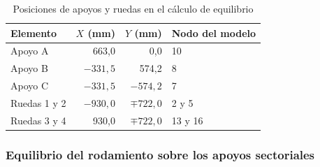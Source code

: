 \begin{table}[htbp]
\centering\small\singlespacing
\caption{Posiciones de apoyos y ruedas en el cálculo de equilibrio}
\label{tab:coordenadas-soporte}
\begin{tabular}{lrrl}
\toprule
\textbf{Elemento} & \textbf{$X$ (mm)} & \textbf{$Y$ (mm)} & \textbf{Nodo del modelo}\\
\midrule
Apoyo A & 663,0 & 0,0 & 10\\
Apoyo B & $-331,5$ & 574,2 & 8\\
Apoyo C & $-331,5$ & $-574,2$ & 7\\
Ruedas 1 y 2 & $-930,0$ & $\mp722,0$ & 2 y 5\\
Ruedas 3 y 4 & 930,0 & $\mp722,0$ & 13 y 16\\
\bottomrule
\end{tabular}
\end{table}

\subsubsection{Equilibrio del rodamiento sobre los apoyos sectoriales}


